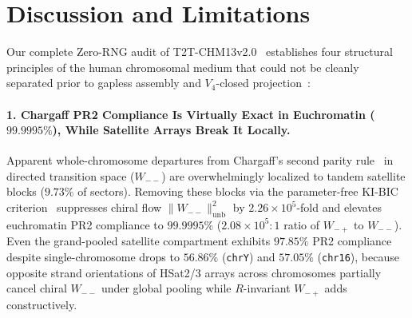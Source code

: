 \documentclass[11pt,a4paper]{article}
\newcommand{\Wmp}{W_{-+}}
\newcommand{\Wmm}{W_{--}}
\begin{document}
\section{Discussion and Limitations}
\label{sec:discussion}

Our complete Zero-RNG audit of T2T-CHM13v2.0~\cite{Nurk2022,Rhie2023,Altemose2022} establishes four structural principles of the human chromosomal medium that could not be cleanly separated prior to gapless assembly and $V_4$-closed projection~\cite{Logvinovich2026}:

\paragraph{1. Chargaff PR2 Compliance Is Virtually Exact in Euchromatin ($99.9995\%$), While Satellite Arrays Break It Locally.}
Apparent whole-chromosome departures from Chargaff's second parity rule~\cite{Chargaff1968} in directed transition space ($\Wmm$) are overwhelmingly localized to tandem satellite blocks ($9.73\%$ of sectors). Removing these blocks via the parameter-free KI-BIC criterion~\cite{Kittler1986} suppresses chiral flow $\|\Wmm\|^2_{\mathrm{unb}}$ by $2.26\times 10^5$-fold and elevates euchromatin PR2 compliance to $99.9995\%$ ($2.08\times 10^5 : 1$ ratio of $\Wmp$ to $\Wmm$). Even the grand-pooled satellite compartment exhibits $97.85\%$ PR2 compliance despite single-chromosome drops to $56.86\%$ (\texttt{chrY}) and $57.05\%$ (\texttt{chr16}), because opposite strand orientations of HSat2/3 arrays across chromosomes partially cancel chiral $\Wmm$ under global pooling while $R$-invariant $\Wmp$ adds constructively.
\end{document}

